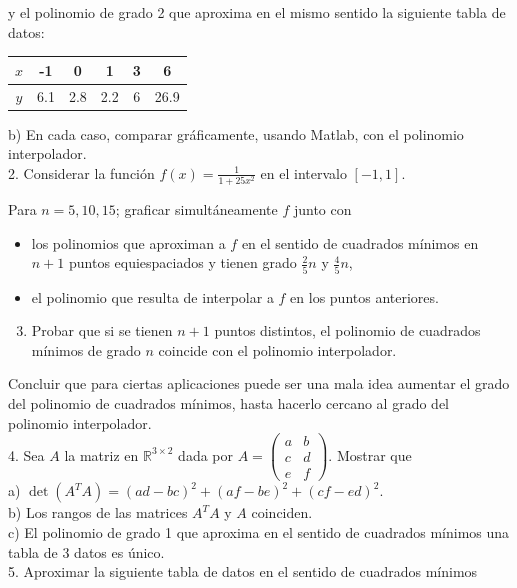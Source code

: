 \documentclass[10pt]{article}
\begin{document}
y el polinomio de grado 2 que aproxima en el mismo sentido la siguiente tabla de datos:

\begin{center}
\begin{tabular}{|c|c|c|c|c|c|}
\hline
$x$ & -1 & 0 & 1 & 3 & 6 \\
\hline
$y$ & 6.1 & 2.8 & 2.2 & 6 & 26.9 \\
\hline
\end{tabular}
\end{center}

b) En cada caso, comparar gráficamente, usando Matlab, con el polinomio interpolador.\\
2. Considerar la función $f(x)=\frac{1}{1+25 x^{2}}$ en el intervalo $[-1,1]$.

Para $n=5,10,15$; graficar simultáneamente $f$ junto con

\begin{itemize}
  \item los polinomios que aproximan a $f$ en el sentido de cuadrados mínimos en $n+1$ puntos equiespaciados y tienen grado $\frac{2}{5} n$ y $\frac{4}{5} n$,
  \item el polinomio que resulta de interpolar a $f$ en los puntos anteriores.
\end{itemize}

\begin{enumerate}
  \setcounter{enumi}{2}
  \item Probar que si se tienen $n+1$ puntos distintos, el polinomio de cuadrados mínimos de grado $n$ coincide con el polinomio interpolador.
\end{enumerate}

Concluir que para ciertas aplicaciones puede ser una mala idea aumentar el grado del polinomio de cuadrados mínimos, hasta hacerlo cercano al grado del polinomio interpolador.\\
4. Sea $A$ la matriz en $\mathbb{R}^{3 \times 2}$ dada por $A=\left(\begin{array}{ll}a & b \\ c & d \\ e & f\end{array}\right)$. Mostrar que\\
a) $\operatorname{det}\left(A^{T} A\right)=(a d-b c)^{2}+(a f-b e)^{2}+(c f-e d)^{2}$.\\
b) Los rangos de las matrices $A^{T} A$ y $A$ coinciden.\\
c) El polinomio de grado 1 que aproxima en el sentido de cuadrados mínimos una tabla de 3 datos es único.\\
5. Aproximar la siguiente tabla de datos en el sentido de cuadrados mínimos
\end{document}
